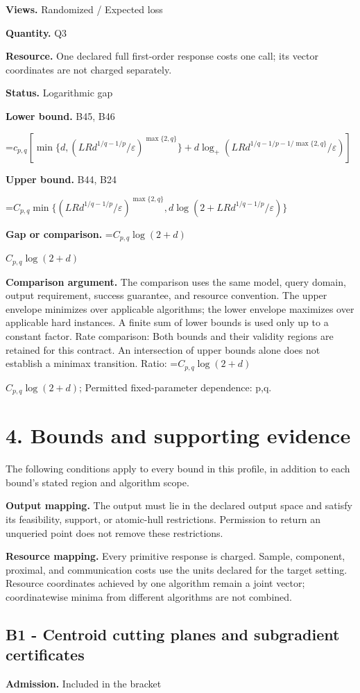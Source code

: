\documentclass[10pt,a4paper]{article}
\newcommand{\AtlasMath}[1]{\par\begingroup\centering\setbox0=\hbox{$\displaystyle #1$}\ifdim\wd0>1.4\linewidth\typeout{ATLAS WIDE FORMULA: \the\wd0}\fi\ifdim\wd0>\linewidth\resizebox{\linewidth}{!}{\box0}\else\box0\fi\par\endgroup}
\newcommand{\AtlasInlineMath}[1]{\begingroup\setbox0=\hbox{$#1$}\ifdim\wd0>.4\linewidth\endgroup\AtlasMath{#1}\else\endgroup$#1$\fi}
\begin{document}
\textbf{Views.} Randomized / Expected loss

\textbf{Quantity.} Q3

\textbf{Resource.} One declared full first-order response costs one call; its vector coordinates are not charged separately.

\textbf{Status.} Logarithmic gap

\textbf{Lower bound.} B45, B46

\AtlasMath{c_{p,q}[\min\{d,(LRd^{1/q-1/p}/\varepsilon)^{\max\{2,q\}}\}+d\log_+(LRd^{1/q-1/p-1/\max\{2,q\}}/\varepsilon)]}
\textbf{Upper bound.} B44, B24

\AtlasMath{C_{p,q}\min\{(LRd^{1/q-1/p}/\varepsilon)^{\max\{2,q\}},d\log(2+LRd^{1/q-1/p}/\varepsilon)\}}
\textbf{Gap or comparison.} \AtlasInlineMath{C_{p,q}\log(2+d)}

\textbf{Comparison argument.} The comparison uses the same model, query domain, output requirement, success guarantee, and resource convention. The upper envelope minimizes over applicable algorithms; the lower envelope maximizes over applicable hard instances. A finite sum of lower bounds is used only up to a constant factor. Rate comparison: Both bounds and their validity regions are retained for this contract. An intersection of upper bounds alone does not establish a minimax transition. Ratio: \AtlasInlineMath{C_{p,q}\log(2+d)}; Permitted fixed-parameter dependence: p,q.

\section{4. Bounds and supporting evidence}
The following conditions apply to every bound in this profile, in addition to each bound's stated region and algorithm scope.

\textbf{Output mapping.} The output must lie in the declared output space and satisfy its feasibility, support, or atomic-hull restrictions. Permission to return an unqueried point does not remove these restrictions.

\textbf{Resource mapping.} Every primitive response is charged. Sample, component, proximal, and communication costs use the units declared for the target setting. Resource coordinates achieved by one algorithm remain a joint vector; coordinatewise minima from different algorithms are not combined.

\subsection{B1 - Centroid cutting planes and subgradient certificates}
\textbf{Admission.} Included in the bracket
\end{document}
